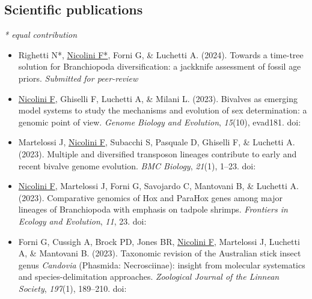 \subsection*{Scientific publications}
\small{\textit{* equal contribution}}
\begin{itemize}
    \item Righetti N*, \underline{Nicolini F*}, Forni G, \& Luchetti A. (2024). Towards a time-tree solution for Branchiopoda diversification: a jackknife assessment of fossil age priors. \textit{Submitted for peer-review}
    \item \underline{Nicolini F}, Ghiselli F, Luchetti A, \& Milani L. (2023). Bivalves as emerging model systems to study the mechanisms and evolution of sex determination: a genomic point of view. \textit{Genome Biology and Evolution}, \textit{15}(10), evad181. doi: 
    \item Martelossi J, \underline{Nicolini F}, Subacchi S, Pasquale D, Ghiselli F, \& Luchetti A. (2023). Multiple and diversified transposon lineages contribute to early and recent bivalve genome evolution. \textit{BMC Biology}, \textit{21}(1), 1--23. doi: 
    \item \underline{Nicolini F}, Martelossi J, Forni G, Savojardo C, Mantovani B, \& Luchetti A. (2023). Comparative genomics of Hox and ParaHox genes among major lineages of Branchiopoda with emphasis on tadpole shrimps. \textit{Frontiers in Ecology and Evolution}, \textit{11}, 23. doi: 
    \item Forni G, Cussigh A, Brock PD, Jones BR, \underline{Nicolini F}, Martelossi J, Luchetti A, \& Mantovani B. (2023). Taxonomic revision of the Australian stick insect genus \textit{Candovia} (Phasmida: Necrosciinae): insight from molecular systematics and species-delimitation approaches. \textit{Zoological Journal of the Linnean Society}, \textit{197}(1), 189--210. doi: 
\end{itemize}